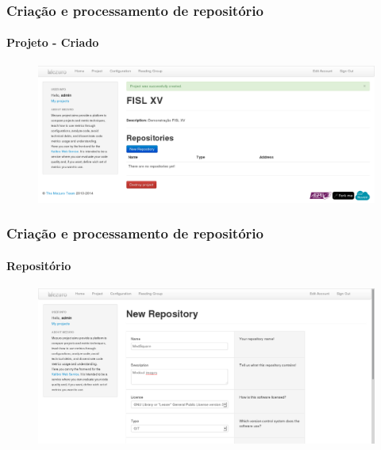 \documentclass{beamer}
\begin{document}
  \begin{frame}
    \frametitle{Criação e processamento de repositório}
    \framesubtitle{Projeto - Criado}

    \begin{figure}[htb]
      \begin{center}
        \includegraphics[scale=0.24]{images/02-new-project-created.png}
      \end{center}
    \end{figure}
  \end{frame}

  \begin{frame}
    \frametitle{Criação e processamento de repositório}
    \framesubtitle{Repositório}

    \begin{figure}[htb]
      \begin{center}
        \includegraphics[scale=0.24]{images/03-new-repository-form.png}
      \end{center}
    \end{figure}
  \end{frame}
\end{document}
